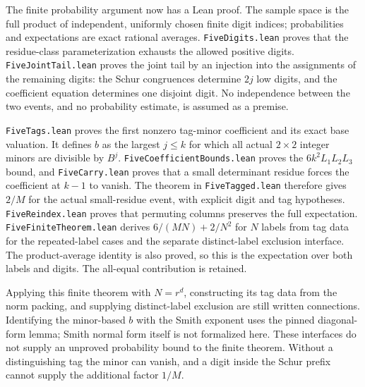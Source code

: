 \documentclass[11pt]{article}
\begin{document}
The finite probability argument now has a Lean proof. The sample space is
the full product of independent, uniformly chosen finite digit indices;
probabilities and expectations are exact rational averages.
\texttt{FiveDigits.lean} proves that the residue-class parameterization
exhausts the allowed positive digits. \texttt{FiveJointTail.lean} proves
the joint tail by an injection into the assignments of the remaining
digits: the Schur congruences determine $2j$ low digits, and the coefficient
equation determines one disjoint digit. No independence between the two
events, and no probability estimate, is assumed as a premise.

\texttt{FiveTags.lean} proves the first nonzero tag-minor coefficient and
its exact base valuation. It defines $b$ as the largest $j\le k$ for which
all actual $2\times2$ integer minors are divisible by $B^j$.
\texttt{FiveCoefficientBounds.lean} proves the $6k^2L_1L_2L_3$ bound,
and \texttt{FiveCarry.lean} proves that a small determinant residue
forces the coefficient at $k-1$ to vanish.
The theorem in \texttt{FiveTagged.lean} therefore gives $2/M$ for the
actual small-residue event, with explicit digit and tag hypotheses.
\texttt{FiveReindex.lean} proves that permuting columns preserves the
full expectation. \texttt{FiveFiniteTheorem.lean} derives
$6/(MN)+2/N^2$ for $N$ labels from tag data for the repeated-label cases
and the separate distinct-label exclusion interface. The product-average
identity is also proved, so this is the expectation over both labels and
digits. The all-equal contribution is retained.

Applying this finite theorem with $N=r^d$, constructing its tag data from
the norm packing, and supplying distinct-label exclusion are still written
connections. Identifying the minor-based $b$ with the Smith exponent uses
the pinned diagonal-form lemma; Smith normal form itself is not formalized
here. These interfaces do not supply an unproved probability bound to the
finite theorem. Without a distinguishing tag the minor can vanish, and a
digit inside the Schur prefix cannot supply the additional factor $1/M$.
\end{document}
